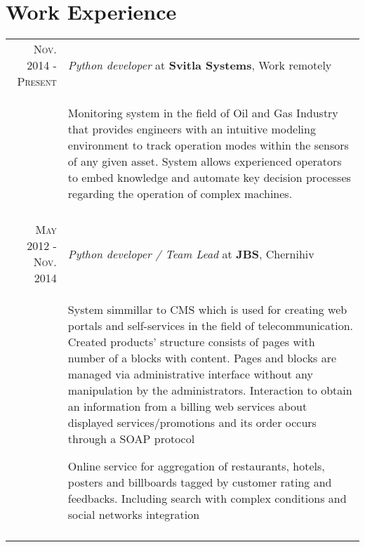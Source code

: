 \documentclass[a4paper,10pt]{article}
\begin{document}
\section{Work Experience}
\begin{tabular}{rp{10cm}}

  \textsc{Nov. 2014 - Present} & \emph{Python developer} at \textbf{Svitla Systems}, Work remotely\\
  & \begin{compactitem}
    \item Monitoring system in the field of Oil and Gas Industry that provides engineers with an intuitive modeling environment to track operation modes within the sensors of any given asset. System allows experienced operators to embed knowledge and automate key decision processes regarding the operation of complex machines.
    \end{compactitem}\vspace{-1em} \\
\multicolumn{2}{c}{} \\

  \textsc{May 2012 - Nov. 2014} & \emph{Python developer / Team Lead} at \textbf{JBS}, Chernihiv\\
  & \begin{compactitem}
    \item System simmillar to CMS which is used for creating web portals and self-services in the field of telecommunication. Created products' structure consists of pages with number of a blocks with content. Pages and blocks are managed via administrative interface without any manipulation by the administrators. Interaction to obtain an information from a billing web services about displayed services/promotions and its order occurs through a SOAP protocol 
    \item Online service for aggregation of restaurants, hotels, posters and billboards tagged by customer rating and feedbacks. Including search with complex conditions and social networks integration
    \end{compactitem}\vspace{-1em} \\
\multicolumn{2}{c}{} \\

\end{tabular}
\end{document}
